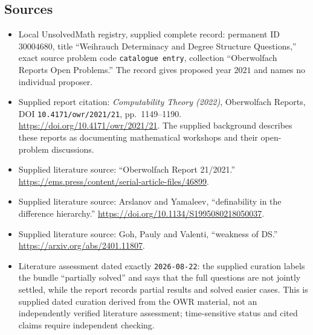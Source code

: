 \documentclass[11pt]{article}
\begin{document}
\subsection{Sources}
\begin{itemize}
\item Local UnsolvedMath registry, supplied complete record: permanent ID \(30004680\), title ``Weihrauch Determinacy and Degree Structure Questions,'' exact source problem code \texttt{catalogue entry}, collection ``Oberwolfach Reports Open Problems.'' The record gives proposed year \(2021\) and names no individual proposer.
\item Supplied report citation: \emph{Computability Theory (2022)}, Oberwolfach Reports, DOI \texttt{10.4171/owr/2021/21}, pp.\ 1149--1190. \url{https://doi.org/10.4171/owr/2021/21}. The supplied background describes these reports as documenting mathematical workshops and their open-problem discussions.
\item Supplied literature source: ``Oberwolfach Report 21/2021.'' \url{https://ems.press/content/serial-article-files/46899}.
\item Supplied literature source: Arslanov and Yamaleev, ``definability in the difference hierarchy.'' \url{https://doi.org/10.1134/S1995080218050037}.
\item Supplied literature source: Goh, Pauly and Valenti, ``weakness of DS.'' \url{https://arxiv.org/abs/2401.11807}.
\item Literature assessment dated exactly \texttt{2026-08-22}: the supplied curation labels the bundle ``partially solved'' and says that the full questions are not jointly settled, while the report records partial results and solved easier cases. This is supplied dated curation derived from the OWR material, not an independently verified literature assessment; time-sensitive status and cited claims require independent checking.
\end{itemize}
\end{document}
